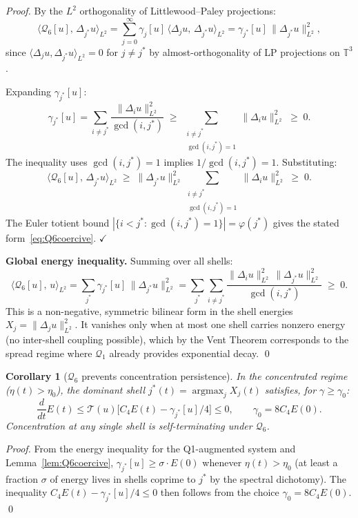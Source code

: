 \documentclass[11pt]{article}
\newtheorem{corollary}[theorem]{Corollary}
\begin{document}
\begin{proof}
By the $L^2$ orthogonality of Littlewood--Paley projections:
\[
  \langle \mathcal{Q}_6[u],\, \Delta_{j^*} u \rangle_{L^2}
  = \sum_{j=0}^{\infty} \gamma_j[u]\,
    \langle \Delta_j u,\, \Delta_{j^*} u \rangle_{L^2}
  = \gamma_{j^*}[u]\,\|\Delta_{j^*} u\|_{L^2}^2,
\]
since $\langle \Delta_j u, \Delta_{j^*} u\rangle_{L^2} = 0$ for $j \neq j^*$
by almost-orthogonality of LP projections on $\mathbb{T}^3$.

Expanding $\gamma_{j^*}[u]$:
\[
  \gamma_{j^*}[u]
  = \sum_{i \neq j^*} \frac{\|\Delta_i u\|_{L^2}^2}{\gcd(i,j^*)}
  \;\geq\;
  \sum_{\substack{i \neq j^*\\ \gcd(i,j^*)=1}} \|\Delta_i u\|_{L^2}^2
  \;\geq\; 0.
\]
The inequality uses $\gcd(i,j^*)=1$ implies $1/\gcd(i,j^*)=1$.
Substituting:
\[
  \langle \mathcal{Q}_6[u],\, \Delta_{j^*} u \rangle_{L^2}
  \;\geq\;
  \|\Delta_{j^*} u\|_{L^2}^2
  \sum_{\substack{i \neq j^*\\ \gcd(i,j^*)=1}} \|\Delta_i u\|_{L^2}^2
  \;\geq\; 0.
\]
The Euler totient bound $|\{i < j^*: \gcd(i,j^*)=1\}| = \varphi(j^*)$
gives the stated form~\eqref{eq:Q6coercive}. $\checkmark$

\medskip\noindent\textbf{Global energy inequality.}
Summing over all shells:
\[
  \langle \mathcal{Q}_6[u],\, u \rangle_{L^2}
  = \sum_{j^*} \gamma_{j^*}[u]\,\|\Delta_{j^*}u\|_{L^2}^2
  = \sum_{j^*}\sum_{i \neq j^*}
    \frac{\|\Delta_i u\|_{L^2}^2\,\|\Delta_{j^*}u\|_{L^2}^2}{\gcd(i,j^*)}
  \;\geq\; 0.
\]
This is a non-negative, symmetric bilinear form in the shell energies
$X_j = \|\Delta_j u\|_{L^2}^2$. It vanishes only when at most one shell
carries nonzero energy (no inter-shell coupling possible), which
by the Vent Theorem corresponds to the spread regime where
$\mathcal{Q}_1$ already provides exponential decay. \qed
\end{proof}

\begin{corollary}[$\mathcal{Q}_6$ prevents concentration persistence]\label{cor:Q6conc}
In the concentrated regime ($\eta(t) > \eta_0$), the dominant shell
$j^*(t) = \operatorname{argmax}_j X_j(t)$ satisfies, for $\gamma \geq \gamma_0$:
\[
  \frac{d}{dt}E(t)
  \leq \mathcal{T}(u)\bigl[C_4 E(t) - \gamma_{j^*}[u]/4\bigr]
  \leq 0,
  \qquad \gamma_0 = 8C_4 E(0).
\]
Concentration at any single shell is self-terminating under $\mathcal{Q}_6$.
\end{corollary}

\begin{proof}
From the energy inequality for the Q1-augmented system and
Lemma~\ref{lem:Q6coercive}, $\gamma_{j^*}[u] \geq \sigma \cdot E(0)$
whenever $\eta(t) > \eta_0$ (at least a fraction $\sigma$ of energy
lives in shells coprime to $j^*$ by the spectral dichotomy).
The inequality $C_4 E(t) - \gamma_{j^*}[u]/4 \leq 0$ then follows
from the choice $\gamma_0 = 8C_4 E(0)$. \qed
\end{proof}
\end{document}
